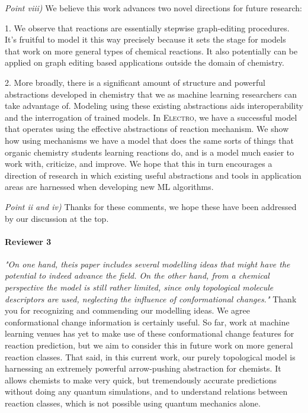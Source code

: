 \documentclass{article}
\newcommand{\ourModel}{\textsc{Electro}\xspace}
\begin{document}
\emph{Point viii)}
We believe this work advances two novel directions for future research:

 1. We observe that reactions are essentially stepwise graph-editing procedures. 
 It’s fruitful to model it this way precisely because it sets the stage for models that work on more general types of chemical reactions.
It also potentially can be applied on graph editing based applications outside the domain of chemistry.

  2. More broadly, there is a significant amount of structure and powerful abstractions developed in chemistry that we as machine learning researchers can take advantage of. 
Modeling using these existing abstractions aids interoperability and the interrogation of trained models.
In \ourModel, we have a successful model that operates using the effective abstractions of reaction mechanism.
We show how using mechanisms we have a model that does the same sorts of things that organic chemistry students learning reactions do, and is a model much easier to work with, criticize, and improve. 
We hope that this in turn encourages a direction of research in which existing useful abstractions and tools in application areas are harnessed when developing new ML algorithms.

 
\emph{Point ii and iv)} Thanks for these comments, we hope these have been addressed by our discussion at the top.



\paragraph{Reviewer 3}
\emph{"On one hand, theis paper includes several modelling ideas that might have the potential to indeed advance the field. On the other hand, from a chemical perspective the model is still rather limited, since only topological molecule descriptors are used, neglecting the influence of conformational changes."}
Thank you for recognizing and commending our modelling ideas. We agree conformational change information is certainly useful. So far, work at machine learning venues has yet to make use of these conformational change features for reaction prediction, but we aim to consider this in future work on more general reaction classes. That said, in this current work, our purely topological model is harnessing an extremely powerful arrow-pushing abstraction for chemists. It allows chemists to make very quick, but tremendously accurate predictions without doing any quantum simulations, and to understand relations between reaction classes, which is not possible using quantum mechanics alone. 
\end{document}
